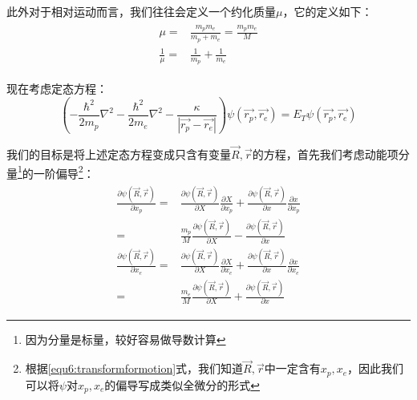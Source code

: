             此外对于相对运动而言，我们往往会定义一个约化质量$\mu$，它的定义如下：
            \begin{align}
                \begin{split}
                    \mu=&\frac{m_pm_e}{m_p+m_e}=\frac{m_pm_e}{M}\\
                    \frac{1}{\mu}=&\frac{1}{m_p}+\frac{1}{m_e}
                \end{split}
            \end{align}
                
            现在考虑定态方程：
            \begin{equation}\label{equ6:stationaryequA}
                (-\frac{\hbar^2}{2m_p}\nabla^2-\frac{\hbar^2}{2m_e}\nabla^2-\frac{\kappa}{|\vec{r_p}-\vec{r_e}|})\psi(\vec{r_p},\vec{r_e})=E_T\psi(\vec{r_p},\vec{r_e})
            \end{equation}
            
            我们的目标是将上述定态方程变成只含有变量$\vec{R},\vec{r}$的方程，首先我们考虑动能项分量\footnote{因为分量是标量，较好容易做导数计算}的一阶偏导\footnote{根据\ref{equ6:transformformotion}式，我们知道$\vec{R},\vec{r}$中一定含有$x_p,x_e$，因此我们可以将$\psi$对$x_p,x_e$的偏导写成类似全微分的形式}：
            \begin{align}
                \begin{split}
                    \frac{\partial\psi(\vec{R},\vec{r})}{\partial x_p}=&\frac{\partial\psi(\vec{R},\vec{r})}{\partial X}\frac{\partial X}{\partial x_p}+\frac{\partial\psi(\vec{R},\vec{r})}{\partial x}\frac{\partial x}{\partial x_p}\\
                    =& \frac{m_p}{M}\frac{\partial\psi(\vec{R},\vec{r})}{\partial X}-\frac{\partial\psi(\vec{R},\vec{r})}{\partial x}\\
                    \frac{\partial\psi(\vec{R},\vec{r})}{\partial x_e}=&\frac{\partial\psi(\vec{R},\vec{r})}{\partial X}\frac{\partial X}{\partial x_e}+\frac{\partial\psi(\vec{R},\vec{r})}{\partial x}\frac{\partial x}{\partial x_e}\\
                    =& \frac{m_e}{M}\frac{\partial\psi(\vec{R},\vec{r})}{\partial X}+\frac{\partial\psi(\vec{R},\vec{r})}{\partial x}
                \end{split}
            \end{align}
            
